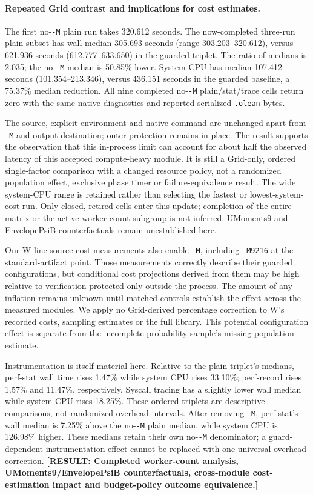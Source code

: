 \documentclass[10pt,twocolumn]{article}
\newcommand{\missing}[1]{\textbf{[RESULT: #1]}}
\begin{document}
\paragraph{Repeated Grid contrast and implications for cost estimates.}
The first no-\texttt{-M} plain run takes 320.612 seconds.
The now-completed three-run plain subset has wall median 305.693 seconds
(range 303.203--320.612), versus 621.936 seconds
(612.777--633.650) in the guarded triplet.
The ratio of medians is 2.035; the no-\texttt{-M} median is 50.85\% lower.
System CPU has median 107.412 seconds (101.354--213.346), versus
436.151 seconds in the guarded baseline, a 75.37\% median reduction.
All nine completed no-\texttt{-M} plain/stat/trace cells return zero with
the same native diagnostics and reported serialized \texttt{.olean} bytes.

The source, explicit environment and native command are unchanged apart
from \texttt{-M} and output destination; outer protection remains in place.
The result supports the observation that this in-process limit can account
for about half the observed latency of this accepted compute-heavy module.
It is still a Grid-only, ordered single-factor comparison with a changed
resource policy, not a randomized population effect, exclusive phase timer
or failure-equivalence result.
The wide system-CPU range is retained rather than selecting the fastest
or lowest-system-cost run.
Only closed, retired cells enter this update; completion of the entire
matrix or the active worker-count subgroup is not inferred.
UMoments9 and EnvelopePsiB counterfactuals remain unestablished here.

Our W-line source-cost measurements also enable \texttt{-M}, including
\texttt{-M9216} at the standard-artifact point.
Those measurements correctly describe their guarded configurations, but
conditional cost projections derived from them may be high relative to
verification protected only outside the process.
The amount of any inflation remains unknown until matched controls
establish the effect across the measured modules.
We apply no Grid-derived percentage correction to W's recorded costs,
sampling estimates or the full library.
This potential configuration effect is separate from the incomplete
probability sample's missing population estimate.

Instrumentation is itself material here. Relative to the plain triplet's
medians, perf-stat wall time rises 1.47\% while system CPU rises 33.10\%;
perf-record rises 1.57\% and 11.47\%, respectively.
Syscall tracing has a slightly lower wall median while system CPU rises
18.25\%. These ordered triplets are descriptive comparisons, not randomized
overhead intervals. After removing \texttt{-M}, perf-stat's wall median
is 7.25\% above the no-\texttt{-M} plain median, while system CPU is
126.98\% higher. These medians retain their own no-\texttt{-M} denominator;
a guard-dependent instrumentation effect cannot be replaced with one
universal overhead correction.
\missing{Completed worker-count analysis, UMoments9/EnvelopePsiB
counterfactuals, cross-module cost-estimation impact and budget-policy
outcome equivalence.}
\end{document}
